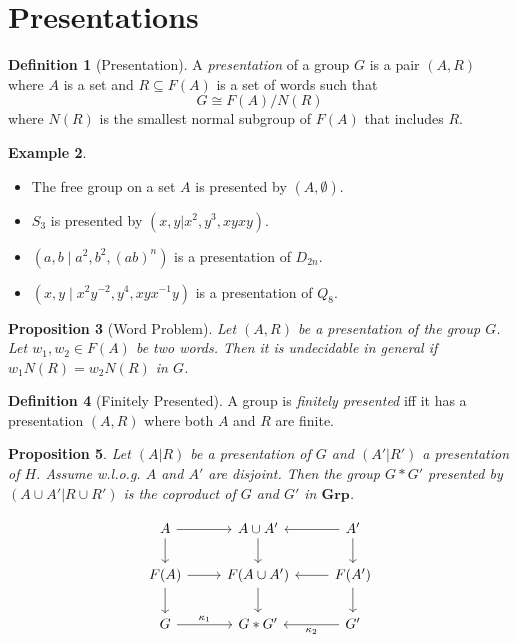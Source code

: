 \documentclass{book}
\newtheorem{prop}{Proposition}[chapter]
\theoremstyle{definition}
\newtheorem{df}[prop]{Definition}
\newtheorem{ex}[prop]{Example}
\begin{document}
\section{Presentations}

\begin{df}[Presentation]
A \emph{presentation} of a group $G$ is a pair $(A,R)$ where $A$ is a set and $R \subseteq F(A)$ is a set of words such that
\[ G \cong F(A) / N(R) \]
where $N(R)$ is the smallest normal subgroup of $F(A)$ that includes $R$.
\end{df}

\begin{ex}
\begin{itemize}
\item The free group on a set $A$ is presented by $(A, \emptyset)$.
\item $S_3$ is presented by $(x,y|x^2,y^3,xyxy)$.
\item 
$(a,b \mid a^2, b^2, (ab)^n)$ is a presentation of $D_{2n}$.
\item $(x,y \mid x^2 y^{-2}, y^4, xyx^{-1}y)$ is a presentation of $Q_8$.
\end{itemize}
\end{ex}

\begin{prop}[Word Problem]
Let $(A,R)$ be a presentation of the group $G$. Let $w_1, w_2 \in F(A)$ be two words. Then it is undecidable in general if $w_1N(R) = w_2N(R)$ in $G$.
\end{prop}

\begin{df}[Finitely Presented]
A group is \emph{finitely presented} iff it has a presentation $(A,R)$ where both $A$ and $R$ are finite.
\end{df}

\begin{prop}
Let $(A|R)$ be a presentation of $G$ and $(A'|R')$ a presentation of $H$. Assume w.l.o.g. $A$ and $A'$ are disjoint. Then the group $G * G'$ presented by $(A \cup A' | R \cup R')$ is the coproduct of $G$ and $G'$ in $\mathbf{Grp}$.
\end{prop}

\[ \begin{tikzcd}
A \arrow[d] \arrow[r] & A \cup A' \arrow[d] & A' \arrow[l] \arrow[d] \\
 F(A) \arrow[d] \arrow[r] & F(A \cup A') \arrow[d] & F(A') \arrow[l] \arrow[d] \\
G \arrow[r, "\kappa_1"] & G * G' & G' \arrow[l, "\kappa_2"]
\end{tikzcd} \]
\end{document}
